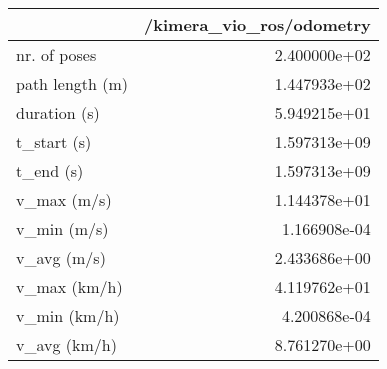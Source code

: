 \begin{tabular}{lr}
\toprule
{} &  /kimera\_vio\_ros/odometry \\
\midrule
nr. of poses    &              2.400000e+02 \\
path length (m) &              1.447933e+02 \\
duration (s)    &              5.949215e+01 \\
t\_start (s)     &              1.597313e+09 \\
t\_end (s)       &              1.597313e+09 \\
v\_max (m/s)     &              1.144378e+01 \\
v\_min (m/s)     &              1.166908e-04 \\
v\_avg (m/s)     &              2.433686e+00 \\
v\_max (km/h)    &              4.119762e+01 \\
v\_min (km/h)    &              4.200868e-04 \\
v\_avg (km/h)    &              8.761270e+00 \\
\bottomrule
\end{tabular}
